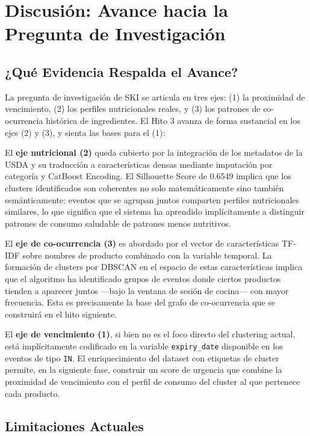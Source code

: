 \documentclass[12pt,a4paper]{article}
\newcommand{\code}[1]{\texttt{\small #1}}
\begin{document}
\section{Discusión: Avance hacia la Pregunta de Investigación}

\subsection{¿Qué Evidencia Respalda el Avance?}

La pregunta de investigación de SKI se articula en tres ejes: (1) la proximidad de vencimiento, (2) los perfiles nutricionales reales, y (3) los patrones de co-ocurrencia histórica de ingredientes. El Hito 3 avanza de forma sustancial en los ejes (2) y (3), y sienta las bases para el (1):

El \textbf{eje nutricional (2)} queda cubierto por la integración de los metadatos de la USDA y su traducción a características densas mediante imputación por categoría y CatBoost Encoding. El Silhouette Score de 0.6549 implica que los clusters identificados son coherentes no solo matemáticamente sino también semánticamente: eventos que se agrupan juntos comparten perfiles nutricionales similares, lo que significa que el sistema ha aprendido implícitamente a distinguir patrones de consumo saludable de patrones menos nutritivos.

El \textbf{eje de co-ocurrencia (3)} es abordado por el vector de características TF-IDF sobre nombres de producto combinado con la variable temporal. La formación de clusters por DBSCAN en el espacio de estas características implica que el algoritmo ha identificado grupos de eventos donde ciertos productos tienden a aparecer juntos —bajo la ventana de sesión de cocina— con mayor frecuencia. Esta es precisamente la base del grafo de co-ocurrencia que se construirá en el hito siguiente.

El \textbf{eje de vencimiento (1)}, si bien no es el foco directo del clustering actual, está implícitamente codificado en la variable \code{expiry\_date} disponible en los eventos de tipo \code{IN}. El enriquecimiento del dataset con etiquetas de cluster permite, en la siguiente fase, construir un score de urgencia que combine la proximidad de vencimiento con el perfil de consumo del cluster al que pertenece cada producto.

\subsection{Limitaciones Actuales}
\end{document}
